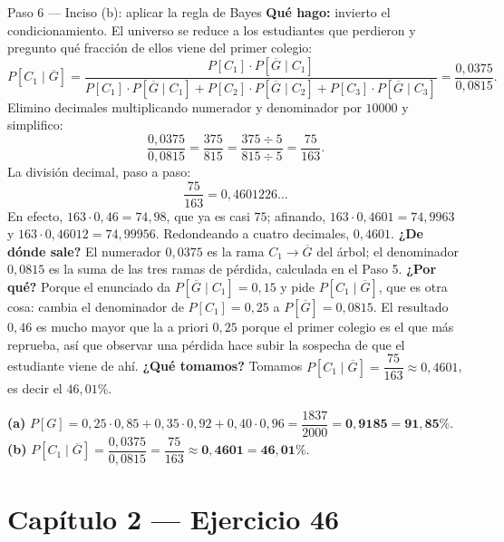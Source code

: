 \documentclass[11pt]{article}
\begin{document}
\begin{sol}
\begin{paso}{Paso 6 --- Inciso (b): aplicar la regla de Bayes}
\textbf{Qu\'e hago:} invierto el condicionamiento. El universo se reduce a los estudiantes que perdieron y pregunto qu\'e fracci\'on de ellos viene del primer colegio:
\[
P[C_1\mid \overline{G}]
=\frac{P[C_1]\cdot P[\overline{G}\mid C_1]}{P[C_1]\cdot P[\overline{G}\mid C_1]+P[C_2]\cdot P[\overline{G}\mid C_2]+P[C_3]\cdot P[\overline{G}\mid C_3]}
=\frac{0{,}0375}{0{,}0815}.
\]
Elimino decimales multiplicando numerador y denominador por $10000$ y simplifico:
\[
\frac{0{,}0375}{0{,}0815}=\frac{375}{815}=\frac{375\div 5}{815\div 5}=\frac{75}{163}.
\]
La divisi\'on decimal, paso a paso:
\[
\frac{75}{163}=0{,}4601226\ldots
\]
En efecto, $163\cdot 0{,}46=74{,}98$, que ya es casi $75$; afinando, $163\cdot 0{,}4601=74{,}9963$ y $163\cdot 0{,}46012=74{,}99956$. Redondeando a cuatro decimales, $0{,}4601$.
\textbf{¿De d\'onde sale?} El numerador $0{,}0375$ es la rama $C_1\to\overline{G}$ del \'arbol; el denominador $0{,}0815$ es la suma de las tres ramas de p\'erdida, calculada en el Paso 5.
\textbf{¿Por qu\'e?} Porque el enunciado da $P[\overline{G}\mid C_1]=0{,}15$ y pide $P[C_1\mid\overline{G}]$, que es otra cosa: cambia el denominador de $P[C_1]=0{,}25$ a $P[\overline{G}]=0{,}0815$. El resultado $0{,}46$ es mucho mayor que la a priori $0{,}25$ porque el primer colegio es el que m\'as reprueba, as\'i que observar una p\'erdida hace subir la sospecha de que el estudiante viene de ah\'i.
\textbf{¿Qu\'e tomamos?} Tomamos $P[C_1\mid\overline{G}]=\dfrac{75}{163}\approx 0{,}4601$, es decir el $46{,}01\%$.
\end{paso}

\end{sol}

\begin{resp}
\textbf{(a)} $P[G]=0{,}25\cdot 0{,}85+0{,}35\cdot 0{,}92+0{,}40\cdot 0{,}96=\dfrac{1837}{2000}=\mathbf{0{,}9185}=\mathbf{91{,}85\%}$.\\[4pt]
\textbf{(b)} $P[C_1\mid\overline{G}]=\dfrac{0{,}0375}{0{,}0815}=\dfrac{75}{163}\approx\mathbf{0{,}4601}=\mathbf{46{,}01\%}$.
\end{resp}

\section*{Cap\'itulo 2 --- Ejercicio 46}
\end{document}
